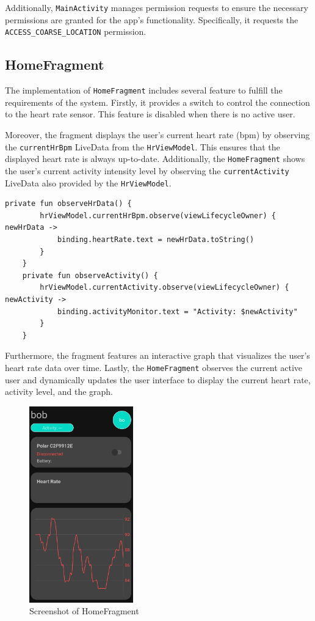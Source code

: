 Additionally, \texttt{MainActivity} manages permission requests to ensure the necessary permissions are granted for the app's functionality. Specifically, it requests the \texttt{ACCESS\_COARSE\_LOCATION} permission.

\subsection{HomeFragment}
The implementation of \texttt{HomeFragment} includes several feature to fulfill the requirements of the system. 
Firstly, it provides a switch to control the connection to the heart rate sensor. This feature is disabled when there is no active user.

Moreover, the fragment displays the user's current heart rate (bpm) by observing the \texttt{currentHrBpm} LiveData from the \texttt{HrViewModel}. This ensures that the displayed heart rate is always up-to-date.
Additionally, the \texttt{HomeFragment} shows the user's current activity intensity level by observing the \texttt{currentActivity} LiveData also provided by the \texttt{HrViewModel}. 
\begin{lstlisting}[caption={Observers for currentActivity and currentHrBpm (HomeFragment)}]
    private fun observeHrData() {
        hrViewModel.currentHrBpm.observe(viewLifecycleOwner) { newHrData ->
            binding.heartRate.text = newHrData.toString()
        }
    }
    private fun observeActivity() {
        hrViewModel.currentActivity.observe(viewLifecycleOwner) { newActivity ->
            binding.activityMonitor.text = "Activity: $newActivity"
        }
    }
\end{lstlisting}

Furthermore, the fragment features an interactive graph that visualizes the user's heart rate data over time. Lastly, the \texttt{HomeFragment} observes the current active user and dynamically updates the user interface to display the current heart rate, activity level, and the graph.
\begin{figure}[H]
    \centering
    \includegraphics[width=0.4\textwidth]{images/homefragment-screenshot.jpeg}
    \caption{Screenshot of HomeFragment}
    \label{fig:homefragment_screenshot}
\end{figure}

